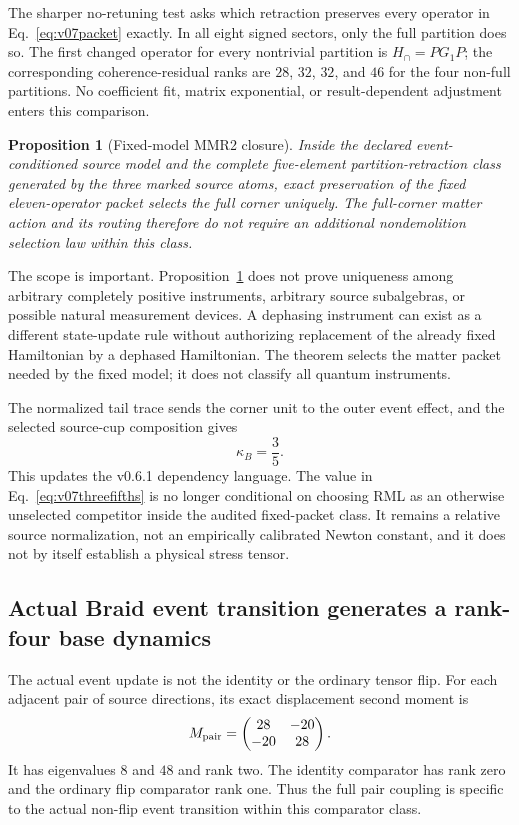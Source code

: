 \documentclass[11pt]{article}
\newtheorem{proposition}[theorem]{Proposition}
\theoremstyle{definition}
\theoremstyle{remark}
\begin{document}
The sharper no-retuning test asks which retraction preserves every operator in Eq.~\eqref{eq:v07packet} exactly. In all eight signed sectors, only the full partition does so. The first changed operator for every nontrivial partition is $H_{\cap}=PG_1P$; the corresponding coherence-residual ranks are $28$, $32$, $32$, and $46$ for the four non-full partitions. No coefficient fit, matrix exponential, or result-dependent adjustment enters this comparison.

\begin{proposition}[Fixed-model MMR2 closure]\label{prop:v07mmr2}
Inside the declared event-conditioned source model and the complete five-element partition-retraction class generated by the three marked source atoms, exact preservation of the fixed eleven-operator packet selects the full corner uniquely. The full-corner matter action and its routing therefore do not require an additional nondemolition selection law within this class.
\end{proposition}

The scope is important. Proposition~\ref{prop:v07mmr2} does not prove uniqueness among arbitrary completely positive instruments, arbitrary source subalgebras, or possible natural measurement devices. A dephasing instrument can exist as a different state-update rule without authorizing replacement of the already fixed Hamiltonian by a dephased Hamiltonian. The theorem selects the matter packet needed by the fixed model; it does not classify all quantum instruments.

The normalized tail trace sends the corner unit to the outer event effect, and the selected source-cup composition gives
\begin{equation}\label{eq:v07threefifths}
 \kappa_B=\frac35.
\end{equation}
This updates the v0.6.1 dependency language. The value in Eq.~\eqref{eq:v07threefifths} is no longer conditional on choosing RML as an otherwise unselected competitor inside the audited fixed-packet class. It remains a relative source normalization, not an empirically calibrated Newton constant, and it does not by itself establish a physical stress tensor.

\subsection{Actual Braid event transition generates a rank-four base dynamics}

The actual event update is not the identity or the ordinary tensor flip. For each adjacent pair of source directions, its exact displacement second moment is
\begin{equation}\label{eq:v07pairmoment}
 M_{\rm pair}=\begin{pmatrix}28&-20\\-20&28\end{pmatrix}.
\end{equation}
It has eigenvalues $8$ and $48$ and rank two. The identity comparator has rank zero and the ordinary flip comparator rank one. Thus the full pair coupling is specific to the actual non-flip event transition within this comparator class.
\end{document}
